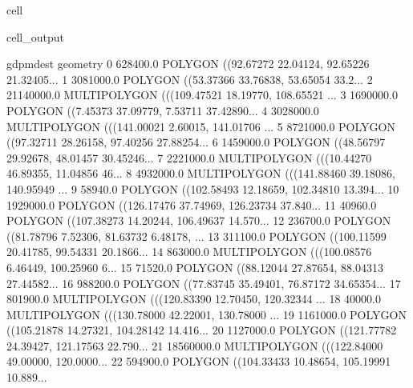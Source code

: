 \documentclass[letterpaper,10pt,english]{jupyterBook}
\begin{document}
\begin{sphinxuseclass}{cell}
\begin{sphinxVerbatimOutput}
\begin{sphinxuseclass}{cell_output}
\begin{sphinxVerbatim}[commandchars=\\\{\}]
    gdp\PYGZus{}md\PYGZus{}est                                           geometry  \PYGZbs{}
0     628400.0  POLYGON ((92.67272 22.04124, 92.65226 21.32405...   
1    3081000.0  POLYGON ((\PYGZhy{}53.37366 \PYGZhy{}33.76838, \PYGZhy{}53.65054 \PYGZhy{}33.2...   
2   21140000.0  MULTIPOLYGON (((109.47521 18.19770, 108.65521 ...   
3    1690000.0  POLYGON ((\PYGZhy{}7.45373 37.09779, \PYGZhy{}7.53711 37.42890...   
4    3028000.0  MULTIPOLYGON (((141.00021 \PYGZhy{}2.60015, 141.01706 ...   
5    8721000.0  POLYGON ((97.32711 28.26158, 97.40256 27.88254...   
6    1459000.0  POLYGON ((48.56797 29.92678, 48.01457 30.45246...   
7    2221000.0  MULTIPOLYGON (((10.44270 46.89355, 11.04856 46...   
8    4932000.0  MULTIPOLYGON (((141.88460 39.18086, 140.95949 ...   
9      58940.0  POLYGON ((102.58493 12.18659, 102.34810 13.394...   
10   1929000.0  POLYGON ((126.17476 37.74969, 126.23734 37.840...   
11     40960.0  POLYGON ((107.38273 14.20244, 106.49637 14.570...   
12    236700.0  POLYGON ((81.78796 7.52306, 81.63732 6.48178, ...   
13    311100.0  POLYGON ((100.11599 20.41785, 99.54331 20.1866...   
14    863000.0  MULTIPOLYGON (((100.08576 6.46449, 100.25960 6...   
15     71520.0  POLYGON ((88.12044 27.87654, 88.04313 27.44582...   
16    988200.0  POLYGON ((77.83745 35.49401, 76.87172 34.65354...   
17    801900.0  MULTIPOLYGON (((120.83390 12.70450, 120.32344 ...   
18     40000.0  MULTIPOLYGON (((130.78000 42.22001, 130.78000 ...   
19   1161000.0  POLYGON ((105.21878 14.27321, 104.28142 14.416...   
20   1127000.0  POLYGON ((121.77782 24.39427, 121.17563 22.790...   
21  18560000.0  MULTIPOLYGON (((\PYGZhy{}122.84000 49.00000, \PYGZhy{}120.0000...   
22    594900.0  POLYGON ((104.33433 10.48654, 105.19991 10.889...   


\end{sphinxVerbatim}
\end{sphinxuseclass}
\end{sphinxVerbatimOutput}
\end{sphinxuseclass}
\end{document}
